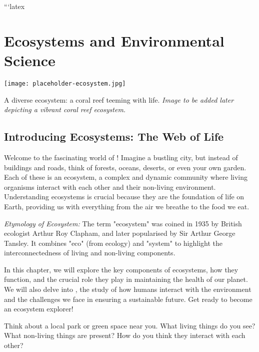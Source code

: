 ```latex
\chapter{Ecosystems and Environmental Science}

\begin{marginfigure}
\texttt{[image: placeholder-ecosystem.jpg]}
\caption{A diverse ecosystem: a coral reef teeming with life. \textit{Image to be added later depicting a vibrant coral reef ecosystem.}}
\end{marginfigure}

\section{Introducing Ecosystems: The Web of Life}

Welcome to the fascinating world of !  Imagine a bustling city, but instead of buildings and roads, think of forests, oceans, deserts, or even your own garden.  Each of these is an ecosystem, a complex and dynamic community where living organisms interact with each other and their non-living environment.  Understanding ecosystems is crucial because they are the foundation of life on Earth, providing us with everything from the air we breathe to the food we eat.

\begin{marginnote}
\textit{Etymology of Ecosystem:} The term "ecosystem" was coined in 1935 by British ecologist Arthur Roy Clapham, and later popularised by Sir Arthur George Tansley.  It combines "eco" (from ecology) and "system" to highlight the interconnectedness of living and non-living components. 
\end{marginnote}

In this chapter, we will explore the key components of ecosystems, how they function, and the crucial role they play in maintaining the health of our planet. We will also delve into , the study of how humans interact with the environment and the challenges we face in ensuring a sustainable future.  Get ready to become an ecosystem explorer!

\begin{stopandthink}
Think about a local park or green space near you. What living things do you see? What non-living things are present? How do you think they interact with each other?
\end{stopandthink}

